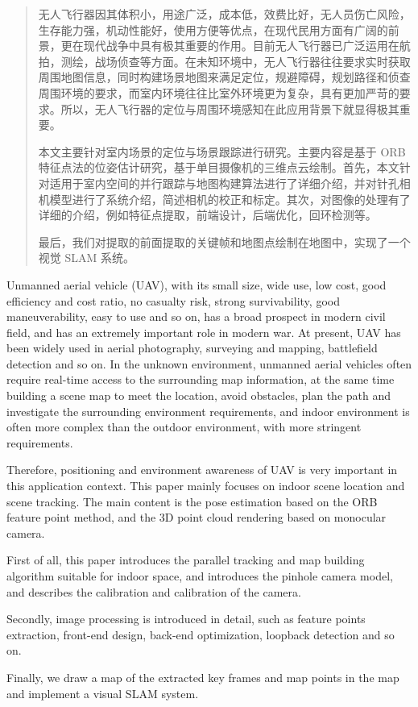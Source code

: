 
\begin{abstract}
无人飞行器因其体积小，用途广泛，成本低，效费比好，无人员伤亡风险，生存能力强，机动性能好，使用方便等优点，在现代民用方面有广阔的前景，更在现代战争中具有极其重要的作用。目前无人飞行器已广泛运用在航拍，测绘，战场侦查等方面。在未知环境中，无人飞行器往往要求实时获取周围地图信息，同时构建场景地图来满足定位，规避障碍，规划路径和侦查周围环境的要求，而室内环境往往比室外环境更为复杂，具有更加严苛的要求。所以，无人飞行器的定位与周围环境感知在此应用背景下就显得极其重要。\par
本文主要针对室内场景的定位与场景跟踪进行研究。主要内容是基于 ORB 特征点法的位姿估计研究，基于单目摄像机的三维点云绘制。首先，本文针对适用于室内空间的并行跟踪与地图构建算法进行了详细介绍，并对针孔相机模型进行了系统介绍，简述相机的校正和标定。其次，对图像的处理有了详细的介绍，例如特征点提取，前端设计，后端优化，回环检测等。\par
最后，我们对提取的前面提取的关键帧和地图点绘制在地图中，实现了一个视觉 SLAM 系统。
\end{abstract}

\begin{enabstract}
Unmanned aerial vehicle (UAV), with its small size, wide use, low cost, good efficiency and cost ratio, no casualty risk, strong survivability, good maneuverability, easy to use and so on, has a broad prospect in modern civil field, and has an extremely important role in modern war. At present, UAV has been widely used in aerial photography, surveying and mapping, battlefield detection and so on. In the unknown environment, unmanned aerial vehicles often require real-time access to the surrounding map information, at the same time building a scene map to meet the location, avoid obstacles, plan the path and investigate the surrounding environment requirements, and indoor environment is often more complex than the outdoor environment, with more stringent requirements.
\par
Therefore, positioning and environment awareness of UAV is very important in this application context. This paper mainly focuses on indoor scene location and scene tracking. The main content is the pose estimation based on the ORB feature point method, and the 3D point cloud rendering based on monocular camera.
\par
First of all, this paper introduces the parallel tracking and map building algorithm suitable for indoor space, and introduces the pinhole camera model, and describes the calibration and calibration of the camera.
\par
Secondly, image processing is introduced in detail, such as feature points extraction, front-end design, back-end optimization, loopback detection and so on.
\par
Finally, we draw a map of the extracted key frames and map points in the map and implement a visual SLAM system.\par  {}
\end{enabstract}
